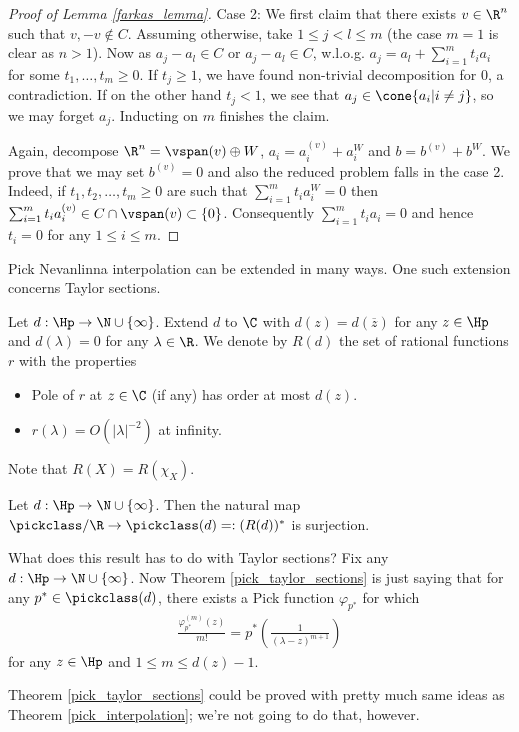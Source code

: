 \begin{proof}[Proof of Lemma \ref{farkas_lemma}]
	Case 2: We first claim that there exists $v \in \R^{n}$ such that $v, -v \notin C$. Assuming otherwise, take $1 \leq j < l \leq m$ (the case $m = 1$ is clear as $n > 1$). Now as $a_{j} - a_{l} \in C$ or $a_{j} - a_{l} \in C$, w.l.o.g. $a_{j} = a_{l} + \sum_{i = 1}^{m} t_{i} a_{i}$ for some $t_{1}, \ldots, t_{m} \geq 0$. If $t_{j} \geq 1$, we have found non-trivial decomposition for $0$, a contradiction. If on the other hand $t_{j} < 1$, we see that $a_{j} \in \cone\{a_{i} | i \neq j\}$, so we may forget $a_{j}$. Inducting on $m$ finishes the claim.

	Again, decompose $\R^{n} = \vspan(v) \oplus W$, $a_{i} = a_{i}^{(v)} + a_{i}^{W}$ and $b = b^{(v)} + b^{W}$. We prove that we may set $b^{(v)} = 0$ and also the reduced problem falls in the case 2. Indeed, if $t_{1}, t_{2}, \ldots, t_{m} \geq 0$ are such that $\sum_{i = 1}^{m} t_{i} a_{i}^{W} = 0$ then $\sum_{i = 1}^{m} t_{i} a_{i}^{(v)} \in C \cap \vspan(v) \subset \{0\}$. Consequently $\sum_{i = 1}^{m} t_{i} a_{i} = 0$ and hence $t_{i} = 0$ for any $1 \leq i \leq m$.
\end{proof}

\begin{huom}
	Pick Nevanlinna interpolation can be extended in many ways. One such extension concerns Taylor sections.
	\begin{maar}
		Let $d : \Hp \to \N \cup \{\infty\}$. Extend $d$ to $\C$ with $d(z) = d(\overline{z})$ for any $z \in \Hp$ and $d(\lambda) = 0$ for any $\lambda \in \R$. We denote by $R(d)$ the set of rational functions $r$ with the properties
		\begin{itemize}
			\item Pole of $r$ at $z \in \C$ (if any) has order at most $d(z)$.
			\item $r(\lambda) = O(|\lambda|^{-2})$ at infinity.
		\end{itemize}
	\end{maar}
	Note that $R(X) = R(\chi_{X})$.
	\begin{lause}\label{pick_taylor_sections}
		Let $d : \Hp \to \N \cup \{\infty\}$. Then the natural map $\pickclass/\R \to \pickclass(d) =: (R(d))^{*}$ is surjection.
	\end{lause}
	What does this result has to do with Taylor sections? Fix any $d : \Hp \to \N \cup \{\infty\}$. Now Theorem \ref{pick_taylor_sections} is just saying that for any $p^{*} \in \pickclass(d)$, there exists a Pick function $\varphi_{p^{*}}$ for which
	\begin{align*}
		\frac{\varphi_{p^{*}}^{(m)}(z)}{m!} = p^{*}\left(\frac{1}{(\lambda - z)^{m + 1}}\right)
	\end{align*}
	for any $z \in \Hp$ and $1 \leq m \leq d(z) - 1$.

	Theorem \ref{pick_taylor_sections} could be proved with pretty much same ideas as Theorem \ref{pick_interpolation}; we're not going to do that, however.
\end{huom}

